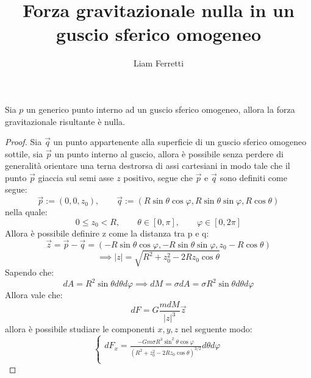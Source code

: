 \documentclass[11pt]{article}
\theoremstyle{plain}
\begin{document}
\title{Forza gravitazionale nulla in un guscio sferico omogeneo}
\author{Liam Ferretti}
\maketitle

Sia $p$ un generico punto interno ad un guscio sferico omogeneo, allora la forza gravitazionale risultante è nulla.

\begin{proof}
    Sia $\vec{q}$ un punto appartenente alla superficie di un guscio sferico omogeneo sottile, sia $\vec{p}$ un punto interno al guscio, allora è possibile senza perdere di generalità orientare una terna destrorsa di assi cartesiani in modo tale che il punto $\vec{p}$ giaccia sul semi asse $z$ positivo, segue che $\vec{p}$ e $\vec{q}$ sono definiti come segue:
    \begin{equation}
        \vec{p} := (0, 0, z_0), \quad \quad \vec{q} := (R\sin\theta\cos\varphi, R\sin\theta\sin\varphi, R\cos\theta)
    \end{equation}
    nella quale:
    \begin{equation}
        0 \leq z_0 < R, \quad \quad \theta \in [0, \pi], \quad \quad \varphi \in [0, 2\pi]
    \end{equation}
    Allora è possibile definire z come la distanza tra p e q:
    \begin{equation}
        \vec{z} = \vec{p} - \vec{q} = (- R\sin\theta\cos\varphi, - R\sin\theta\sin\varphi, z_0 - R\cos\theta)
    \end{equation}
    \begin{equation}
        \implies |z| = \sqrt{R^2 + z_0^2 - 2Rz_0\cos\theta} 
    \end{equation}
    Sapendo che:
    \begin{equation}
        dA = R^2\sin\theta d\theta d\varphi \implies dM = \sigma dA = \sigma R^2 \sin\theta d\theta d\varphi
    \end{equation}
    Allora vale che:
    \begin{equation}
        dF = G\frac{mdM}{|z|^3}\vec{z}
    \end{equation}
    allora è possibile studiare le componenti $x, y, z$ nel seguente modo:
    \begin{equation}
        \begin{cases}
            \displaystyle dF_x = \frac{-Gm\sigma R^3\sin^2\theta\cos\varphi}{(R^2 + z_0^2 - 2Rz_0\cos\theta)^{3/2}}d\theta d\varphi \\[1.2em]

\end{cases}
\end{equation}
\end{proof}
\end{document}
